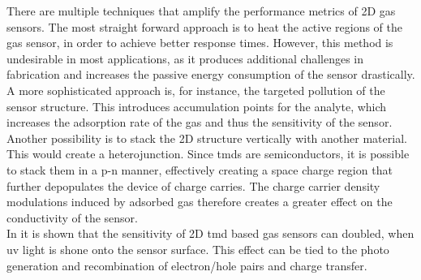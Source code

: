 There are multiple techniques that amplify the performance metrics of 2D gas sensors. The most straight forward approach is to heat the active regions of the gas sensor, in order to achieve better response times. However, this method is undesirable in most applications, as it produces additional challenges in fabrication and increases the passive energy consumption of the sensor drastically. A more sophisticated approach is, for instance, the targeted pollution of the sensor structure. This introduces accumulation points for the analyte, which increases the adsorption rate of the gas and thus the sensitivity of the sensor. \\
Another possibility is to stack the 2D structure vertically with another material. This would create a heterojunction. Since \glspl{tmd} are semiconductors, it is possible to stack them in a p-n manner, effectively creating a space charge region that further depopulates the device of charge carries. The charge carrier density modulations induced by adsorbed gas therefore creates a greater effect on the conductivity of the sensor. \\ 
In \cite{Gu2018} it is shown that the sensitivity of 2D \gls{tmd} based gas sensors can doubled, when \Gls{uv} light is shone onto the sensor surface. This effect can be tied to the photo generation and recombination of electron/hole pairs and charge transfer.
